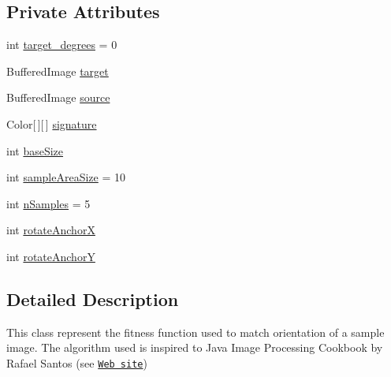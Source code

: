 \subsection*{Private Attributes}
\begin{DoxyCompactItemize}
\item 
int \hyperlink{classjenes_1_1tutorials_1_1problem11_1_1_image_matching_fitness_abcf68166173033e945f0ed4c42520a84}{target\-\_\-degrees} = 0
\item 
Buffered\-Image \hyperlink{classjenes_1_1tutorials_1_1problem11_1_1_image_matching_fitness_a3607fd64f431452de7de69cdd659445c}{target}
\item 
Buffered\-Image \hyperlink{classjenes_1_1tutorials_1_1problem11_1_1_image_matching_fitness_a43f4833e41f19eadc706b7ec449033a8}{source}
\item 
Color\mbox{[}$\,$\mbox{]}\mbox{[}$\,$\mbox{]} \hyperlink{classjenes_1_1tutorials_1_1problem11_1_1_image_matching_fitness_a46fadaf9894a8034b8919db788936f13}{signature}
\item 
int \hyperlink{classjenes_1_1tutorials_1_1problem11_1_1_image_matching_fitness_a3ec1a20065a2507f241ccff6f8b37e61}{base\-Size}
\item 
int \hyperlink{classjenes_1_1tutorials_1_1problem11_1_1_image_matching_fitness_acf5074dfbb8053f47ce1c03f3b88c121}{sample\-Area\-Size} = 10
\item 
int \hyperlink{classjenes_1_1tutorials_1_1problem11_1_1_image_matching_fitness_a7cb7be6a6a88f840d4824bbaddd9bac8}{n\-Samples} = 5
\item 
int \hyperlink{classjenes_1_1tutorials_1_1problem11_1_1_image_matching_fitness_a4646b0df9daaccbb004c04b2f8f6afb3}{rotate\-Anchor\-X}
\item 
int \hyperlink{classjenes_1_1tutorials_1_1problem11_1_1_image_matching_fitness_a9a0546b58cf181426dafb31f8d0ec3c6}{rotate\-Anchor\-Y}
\end{DoxyCompactItemize}


\subsection{Detailed Description}
This class represent the fitness function used to match orientation of a sample image. The algorithm used is inspired to Java Image Processing Cookbook by Rafael Santos (see \href{http://www.lac.inpe.br/JIPCookbook/}{\tt Web site}) 

